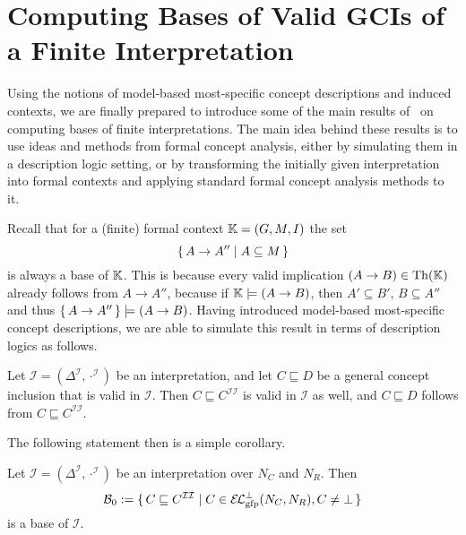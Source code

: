 \section{Computing Bases of Valid GCIs of a Finite Interpretation}
\label{sec:base-all-valid}

Using the notions of model-based most-specific concept descriptions and induced contexts,
we are finally prepared to introduce some of the main results of~\cite{Diss-Felix} on
computing bases of finite interpretations.  The main idea behind these results is to use
ideas and methods from formal concept analysis, either by simulating them in a description
logic setting, or by transforming the initially given interpretation into formal contexts
and applying standard formal concept analysis methods to it.

Recall that for a (finite) formal context ${\mathbb{K}} = (G, M, I)$ the set
\begin{equation*}
  {\ensuremath{\{\, A \to A'' \mid A \subseteq M \,\}}}
\end{equation*}
is always a base of ${\mathbb{K}}$.  This is because every valid implication $(A \to B) \in
\operatorname{Th}({\mathbb{K}})$ already follows from $A \to A''$, because if ${\mathbb{K}} \models (A \to B)$, then
$A' \subseteq B'$, \ie $B \subseteq A''$ and thus ${\{\, A \to A ''\,\}} \models (A \to B)$.
Having introduced model-based most-specific concept descriptions, we are able to simulate
this result in terms of description logics as follows.

\begin{Lemma}
  \label{lem:simple-entailment-with-mmsc}
  Let $\mathcal{I} = (\Delta^{\mathcal{I}}, \cdot^{\mathcal{I}})$ be an interpretation,
  and let $C \sqsubseteq D$ be a general concept inclusion that is valid in $\mathcal{I}$.
  Then $C \sqsubseteq C^{\mathcal{I}\mathcal{I}}$ is valid in $\mathcal{I}$ as well, and
  $C \sqsubseteq D$ follows from $C \sqsubseteq C^{\mathcal{I}\mathcal{I}}$.
\end{Lemma}

The following statement then is a simple corollary.

\begin{Corollary}
  \label{cor:Felix-base-B0}
  Let $\mathcal{I} = (\Delta^{\mathcal{I}}, \cdot^{\mathcal{I}})$ be an interpretation
  over $N_C$ and $N_R$.  Then
  \begin{equation}
    \label{eq:20}
    \mathcal{B}_0 := \set{ C \sqsubseteq C^{\mathcal{I}\mathcal{I}} \mid C \in
      \ELgfpbot(N_C, N_R), C \neq \bot }
  \end{equation}
  is a base of $\mathcal{I}$.
\end{Corollary}

